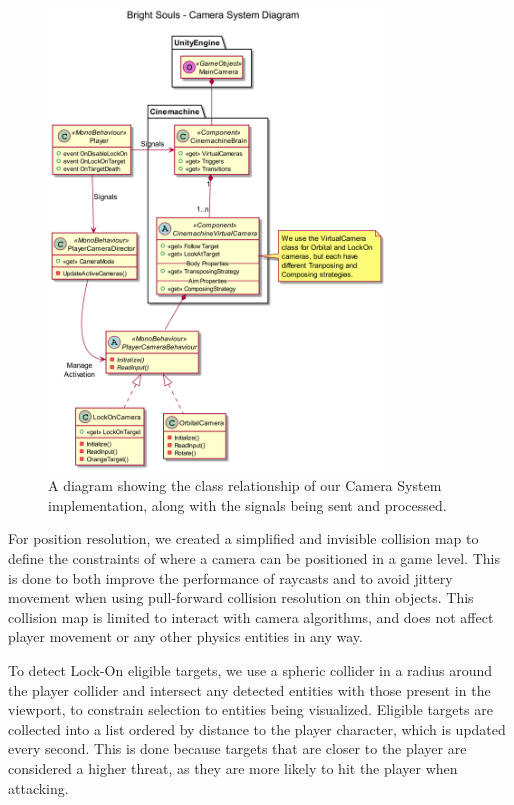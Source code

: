\begin{figure}[!ht]
    \caption{A diagram showing the class relationship of our Camera System implementation, along with the signals being sent and processed.}
    \vspace{0.5em}
    \begin{center}
        \includegraphics[width=24em]{figures/fig-camera-system-class-diagram.png}
    \end{center}
    \label{fig:camera-class-diagram}
\end{figure}

For position resolution, we created a simplified and invisible collision map to define the constraints of where a camera can be positioned in a game level. This is done to both improve the performance of raycasts and to avoid jittery movement when using pull-forward collision resolution on thin objects. This collision map is limited to interact with camera algorithms, and does not affect player movement or any other physics entities in any way.

To detect Lock-On eligible targets, we use a spheric collider in a radius around the player collider and intersect any detected entities with those present in the viewport, to constrain selection to entities being visualized. Eligible targets are collected into a list ordered by distance to the player character, which is updated every second. This is done because targets that are closer to the player are considered a higher threat, as they are more likely to hit the player when attacking.

